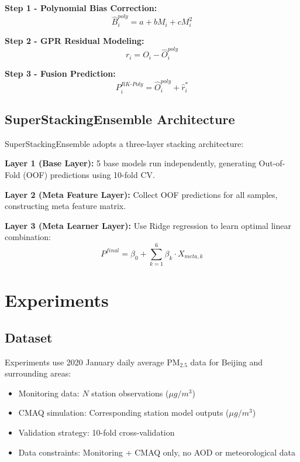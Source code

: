 \textbf{Step 1 - Polynomial Bias Correction:}
\begin{equation}
    \hat{B}^{poly}_i = a + b M_i + c M_i^2
    \label{eq:poly_fit}
\end{equation}

\textbf{Step 2 - GPR Residual Modeling:}
\begin{equation}
    r_i = O_i - \hat{O}^{poly}_i
    \label{eq:residual}
\end{equation}

\textbf{Step 3 - Fusion Prediction:}
\begin{equation}
    P^{RK\text{-}Poly}_i = \hat{O}^{poly}_i + \hat{r}^*_i
    \label{eq:rkpoly_final}
\end{equation}

\subsection{SuperStackingEnsemble Architecture}

SuperStackingEnsemble adopts a three-layer stacking architecture:

\textbf{Layer 1 (Base Layer):} 5 base models run independently, generating Out-of-Fold (OOF) predictions using 10-fold CV.

\textbf{Layer 2 (Meta Feature Layer):} Collect OOF predictions for all samples, constructing meta feature matrix.

\textbf{Layer 3 (Meta Learner Layer):} Use Ridge regression to learn optimal linear combination:
\begin{equation}
    P^{final} = \beta_0 + \sum_{k=1}^{6} \beta_k \cdot X_{meta,k}
    \label{eq:meta}
\end{equation}

\section{Experiments}
\label{sec:exp}

\subsection{Dataset}

Experiments use 2020 January daily average PM$_{2.5}$ data for Beijing and surrounding areas:
\begin{itemize}
    \item Monitoring data: $N$ station observations ($\mu g/m^3$)
    \item CMAQ simulation: Corresponding station model outputs ($\mu g/m^3$)
    \item Validation strategy: 10-fold cross-validation
    \item Data constraints: Monitoring + CMAQ only, no AOD or meteorological data
\end{itemize}

